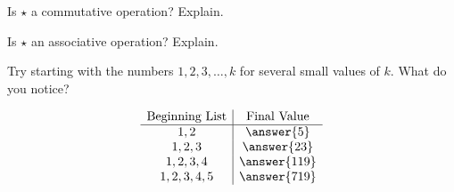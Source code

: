 \documentclass{ximera}
\begin{document}
\begin{problem}
Is $\star$ a commutative operation?  Explain.  
\begin{freeResponse}
\end{freeResponse}
\end{problem}


\begin{problem}
Is $\star$ an associative operation?  Explain.  
\begin{freeResponse}
\end{freeResponse}
\end{problem}

\begin{problem}
Try starting with the numbers $1,2,3,\dots, k$ for several small values of $k$.  What do you notice?  

\[
\begin{array}{c|c}
\text{Beginning List}& \text{Final Value} \\
\hline
1,  2 & \answer{5}  \\
1,  2,  3 & \answer{23} \\  
1,  2,  3, 4 & \answer{119} \\
1,  2,  3, 4, 5 & \answer{719}
\end{array}
\]

\end{problem}
\end{document}

